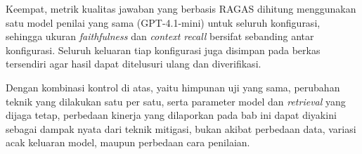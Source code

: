 Keempat, metrik kualitas jawaban yang berbasis RAGAS dihitung menggunakan satu model penilai yang sama (GPT-4.1-mini) untuk seluruh konfigurasi, sehingga ukuran \textit{faithfulness} dan \textit{context recall} bersifat sebanding antar konfigurasi. Seluruh keluaran tiap konfigurasi juga disimpan pada berkas tersendiri agar hasil dapat ditelusuri ulang dan diverifikasi.

Dengan kombinasi kontrol di atas, yaitu himpunan uji yang sama, perubahan teknik yang dilakukan satu per satu, serta parameter model dan \textit{retrieval} yang dijaga tetap, perbedaan kinerja yang dilaporkan pada bab ini dapat diyakini sebagai dampak nyata dari teknik mitigasi, bukan akibat perbedaan data, variasi acak keluaran model, maupun perbedaan cara penilaian.

